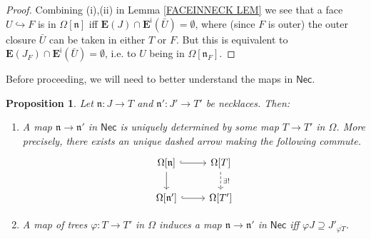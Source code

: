 \documentclass[a4paper,10pt
,draft
]{article}%
\numberwithin{equation}{section}
\numberwithin{figure}{section}
\newtheorem{proposition}[equation]{Proposition}%
\theoremstyle{definition} %
\newcommand{\1}{\ensuremath{\mathbbm 1}}%
\begin{document}
\begin{proof}
	Combining (i),(ii) in 
	Lemma \ref{FACEINNECK LEM}
	we see that a face $U \hookrightarrow F$ is
	in $\Omega[\mathfrak{n}]$
	iff $\boldsymbol{E}(J) \cap 
	\boldsymbol{E}^{\mathsf{i}}(\bar{U}) = \emptyset$,
	where (since $F$ is outer) the outer closure $\bar{U}$
	can be taken in either $T$ or $F$.
	But this is equivalent to 
	$\boldsymbol{E}(J_F) \cap 
	\boldsymbol{E}^{\mathsf{i}}(\bar{U}) = \emptyset$,
	i.e. to $U$ being in $\Omega[\mathfrak{n}_F]$.
\end{proof}



Before proceeding, we will need to better understand the maps in 
$\mathsf{Nec}$.





\begin{proposition}\label{MAPNECK PROP}
	Let $\mathfrak{n}\colon J \to T$ and $\mathfrak{n}' \colon J' \to T'$ be necklaces. Then:
\begin{enumerate}
\item[(i)]
	A map $\mathfrak{n} \to \mathfrak{n}'$ in $\mathsf{Nec}$
	is uniquely determined by some map 
	$T \to T'$ in $\Omega$. 
	More precisely, there exists an unique dashed arrow
	making the following commute.
\begin{equation}\label{NECKMAP EQ}
\begin{tikzcd}
	\Omega[\mathfrak{n}] 
	\ar[hookrightarrow]{r} 
	\ar{d}
&
	\Omega[T] 
	\ar[dashed]{d}{\exists !}
\\
	\Omega[\mathfrak{n}']
	\ar[hookrightarrow]{r}
&
	\Omega[T']
	\end{tikzcd}
\end{equation}
\item[(ii)]
	A map of trees 
	$\varphi \colon T \to T'$ in $\Omega$
	induces a map 
	$\mathfrak{n} \to \mathfrak{n}'$ in $\mathsf{Nec}$
	iff
	$\varphi J \supseteq J'_{\overline{\varphi T}}$.
\end{enumerate}
\end{proposition}
\end{document}
